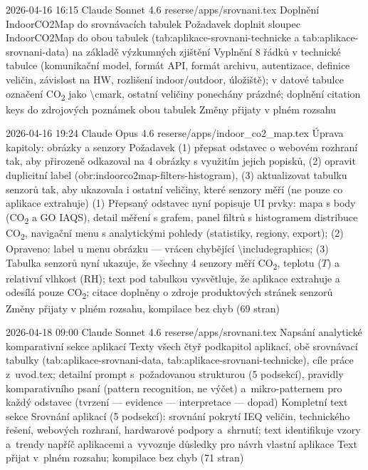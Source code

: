 \logentry
  {2026-04-16 16:15}
  {Claude Sonnet 4.6}
  {reserse/apps/srovnani.tex}
  {Doplnění IndoorCO2Map do srovnávacích tabulek}
  {Požadavek doplnit sloupec IndoorCO2Map do obou tabulek (tab:aplikace-srovnani-technicke a tab:aplikace-srovnani-data) na základě výzkumných zjištění}
  {Vyplnění 8 řádků v technické tabulce (komunikační model, formát API, formát archivu, autentizace, definice veličin, závislost na HW, rozlišení indoor/outdoor, úložiště); v datové tabulce označení CO\textsubscript{2} jako \textbackslash cmark, ostatní veličiny ponechány prázdné; doplnění citation keys do zdrojových poznámek obou tabulek}
  {Změny přijaty v plném rozsahu}

\logentry
  {2026-04-16 19:24}
  {Claude Opus 4.6}
  {reserse/apps/indoor\_co2\_map.tex}
  {Úprava kapitoly: obrázky a senzory}
  {Požadavek (1) přepsat odstavec o webovém rozhraní tak, aby přirozeně odkazoval na 4 obrázky s využitím jejich popisků, (2) opravit duplicitní label (obr:indoorco2map-filters-histogram), (3) aktualizovat tabulku senzorů tak, aby ukazovala i ostatní veličiny, které senzory měří (ne pouze co aplikace extrahuje)}
  {(1) Přepsaný odstavec nyní popisuje UI prvky: mapa s body (CO\textsubscript{2} a GO IAQS), detail měření s grafem, panel filtrů s histogramem distribuce CO\textsubscript{2}, navigační menu s analytickými pohledy (statistiky, regiony, export); (2) Opraveno: label u menu obrázku — vrácen chybějící \textbackslash includegraphics; (3) Tabulka senzorů nyní ukazuje, že všechny 4 senzory měří CO\textsubscript{2}, teplotu ($T$) a relativní vlhkost (RH); text pod tabulkou vysvětluje, že aplikace extrahuje a odesílá pouze CO\textsubscript{2}; citace doplněny o zdroje produktových stránek senzorů}
  {Změny přijaty v plném rozsahu, kompilace bez chyb (69 stran)}

\logentry
  {2026-04-18 09:00}
  {Claude Sonnet 4.6}
  {reserse/apps/srovnani.tex}
  {Napsání analytické komparativní sekce aplikací}
  {Texty všech čtyř podkapitol aplikací, obě srovnávací tabulky (tab:aplikace-srovnani-data, tab:aplikace-srovnani-technicke), cíle práce z~uvod.tex; detailní prompt s~požadovanou strukturou (5 podsekcí), pravidly komparativního psaní (pattern recognition, ne výčet) a~mikro-patternem pro každý odstavec (tvrzení — evidence — interpretace — dopad)}
  {Kompletní text sekce Srovnání aplikací (5 podsekcí): srovnání pokrytí IEQ veličin, technického řešení, webových rozhraní, hardwarové podpory a~shrnutí; text identifikuje vzory a~trendy napříč aplikacemi a~vyvozuje důsledky pro návrh vlastní aplikace}
  {Text přijat v~plném rozsahu; kompilace bez chyb (71 stran)}

